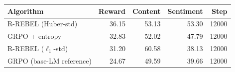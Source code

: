 \begin{tabular}{lrrrr}
\toprule
Algorithm & Reward & Content & Sentiment & Step \\
\midrule
R-REBEL (Huber-std) & 36.15 & 53.13 & 53.30 & 12000 \\
GRPO + entropy & 32.83 & 52.02 & 47.79 & 12000 \\
R-REBEL ($\ell_1$-std) & 31.20 & 60.58 & 38.13 & 12000 \\
GRPO (base-LM reference) & 24.67 & 49.59 & 39.66 & 12000 \\
\bottomrule
\end{tabular}
